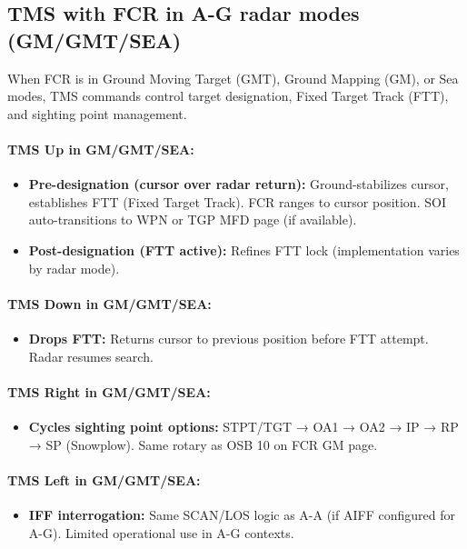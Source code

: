 \documentclass[11pt, a4paper, twoside]{report}
\begin{document}
\subsection{TMS with FCR in A-G radar modes (GM/GMT/SEA)}
\label{sec:C3-S4-S1}

When FCR is in Ground Moving Target (GMT), Ground Mapping (GM), or Sea modes, TMS commands control target designation, Fixed Target Track (FTT), and sighting point management.

\paragraph{TMS Up in GM/GMT/SEA:}
\begin{itemize}
    \item \textbf{Pre-designation (cursor over radar return):} Ground-stabilizes cursor, establishes FTT (Fixed Target Track). FCR ranges to cursor position. SOI auto-transitions to WPN or TGP MFD page (if available).
    \item \textbf{Post-designation (FTT active):} Refines FTT lock (implementation varies by radar mode).
\end{itemize}

\paragraph{TMS Down in GM/GMT/SEA:}
\begin{itemize}
    \item \textbf{Drops FTT:} Returns cursor to previous position before FTT attempt. Radar resumes search.
\end{itemize}

\paragraph{TMS Right in GM/GMT/SEA:}
\begin{itemize}
    \item \textbf{Cycles sighting point options:} STPT/TGT → OA1 → OA2 → IP → RP → SP (Snowplow). Same rotary as OSB 10 on FCR GM page.
\end{itemize}

\paragraph{TMS Left in GM/GMT/SEA:}
\begin{itemize}
    \item \textbf{IFF interrogation:} Same SCAN/LOS logic as A-A (if AIFF configured for A-G). Limited operational use in A-G contexts.
\end{itemize}
\end{document}
